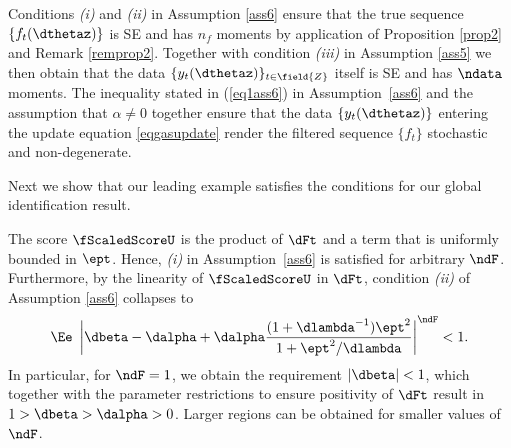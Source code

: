 
Conditions \textit{(i)} and \textit{(ii)} in Assumption \ref{ass6} ensure that the true sequence $\{f_{t}(\dthetaz)\}$ is SE and has $n_{f}$ moments by application of Proposition \ref{prop2} and Remark \ref{remprop2}. Together with condition \textit{(iii)} in Assumption \ref{ass5} we then obtain that the data $\{y_{t}(\dthetaz)\}_{t \in \field{Z}}$ itself is SE and has $\ndata$ moments.
The inequality stated in (\ref{eq1ass6}) in Assumption~\ref{ass6} and the assumption that $\alpha \neq 0$ together ensure that the data $\{y_{t}(\dthetaz)\}$ entering the update equation \eqref{eqgasupdate} render the filtered sequence $\{f_{t}\}$ stochastic and non-degenerate.

Next we show that our leading example satisfies the conditions for our global identification result.  
 \begin{exmc} %
The score $\fScaledScoreU$ is the product of $\dFt$ and a term that is uniformly bounded in $\ept$. Hence,  \textit{(i)} in Assumption~\ref{ass6} is satisfied for arbitrary $\ndF$.
Furthermore, by the linearity of $\fScaledScoreU$ in $\dFt$, condition \textit{(ii)} of Assumption \ref{ass6} collapses to 
\[
	\Ee\ \left| \dbeta - \dalpha + \dalpha \frac{(1+\dlambda^{-1})\ept^2}{1+\ept^2/\dlambda} \right|^{\ndF}
	< 1.
\]
In particular, for $\ndF=1$, we obtain the requirement $|\dbeta|<1$, which together with the parameter restrictions to ensure positivity of $\dFt$ result in $1>\dbeta>\dalpha>0$. Larger regions can be obtained for smaller values of $\ndF$.
\end{exmc}

 

